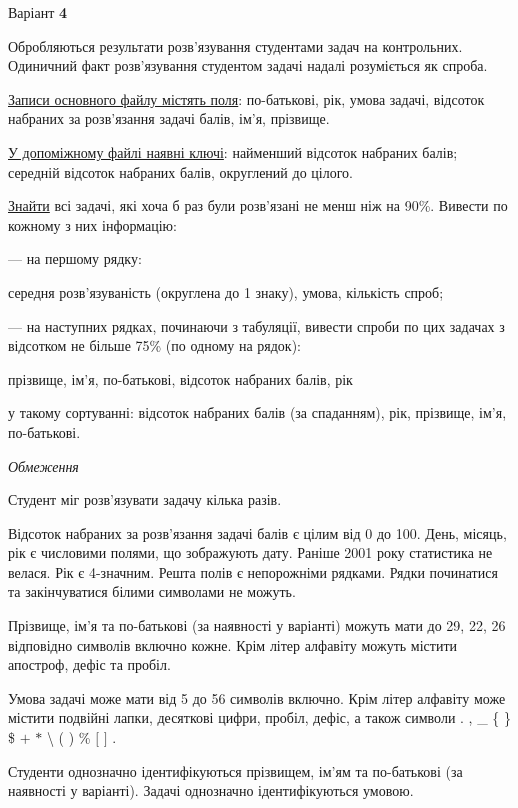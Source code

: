 \documentclass[11pt, ukrainian]{article}
\begin{document}
\par
\newpage
{\center Варіант  \No \textbf { 4 }\par}
\bigskip
Обробляються результати розв’язування студентами задач на контрольних.
Одиничний факт роз\-в’я\-зу\-вання студентом задачі надалі розуміється як спроба.

\underline{Записи основного файлу містять поля}: по-батькові, рік, умова задачі, відсоток набраних за розв’я\-зан\-ня задачі балів, ім’я, прізвище.

\underline{У допоміжному файлі наявні ключі}: найменший відсоток набраних балів; середній відсоток набраних балів, округлений до цілого.

\underline{Знайти} всі задачі, які хоча б раз були розв’язані не менш ніж на 90\%. Вивести по кожному з них інформацію:\par
{\noindent}--- на першому рядку:\par
середня розв’язуваність (округлена до 1 знаку), умова, кількість спроб;

{\noindent}--- на наступних рядках, починаючи з табуляції, вивести спроби по цих задачах з відсотком не більше 75\% (по одному на рядок):\par
прізвище, ім’я, по-батькові, відсоток набраних балів, рік

{\noindent}у такому сортуванні: відсоток набраних балів (за спаданням), рік, прізвище, ім’я, по-батькові.


\bigskip\textit{Обмеження}

Студент міг розв’язувати задачу кілька разів.

Відсоток набраних за розв’язання задачі балів є цілим від 0 до 100.
День, місяць, рік є числовими полями, що зображують дату.
Раніше 2001 року статистика не велася. Рік є 4-значним.
Решта полів є непорожніми рядками.
Рядки починатися та закінчуватися білими символами не можуть.

Прізвище, ім’я та по-батькові (за наявності у варіанті) можуть мати до 29, 22, 26 відповідно символів включно кожне. 
Крім літер алфавіту можуть містити апостроф, дефіс та пробіл.

Умова задачі може мати від 5 до 56 символів включно.
Крім літер алфавіту може містити подвійні лапки, десяткові цифри, пробіл, дефіс,
а також символи . , \_ \{ \} \$ $+$ $*$ {\textbackslash} ( ) \% $[$ $]$ .

Студенти однозначно ідентифікуються прізвищем, ім’ям та по-батькові (за наявності у варіанті).
Задачі однозначно ідентифікуються умовою.
\end{document}
